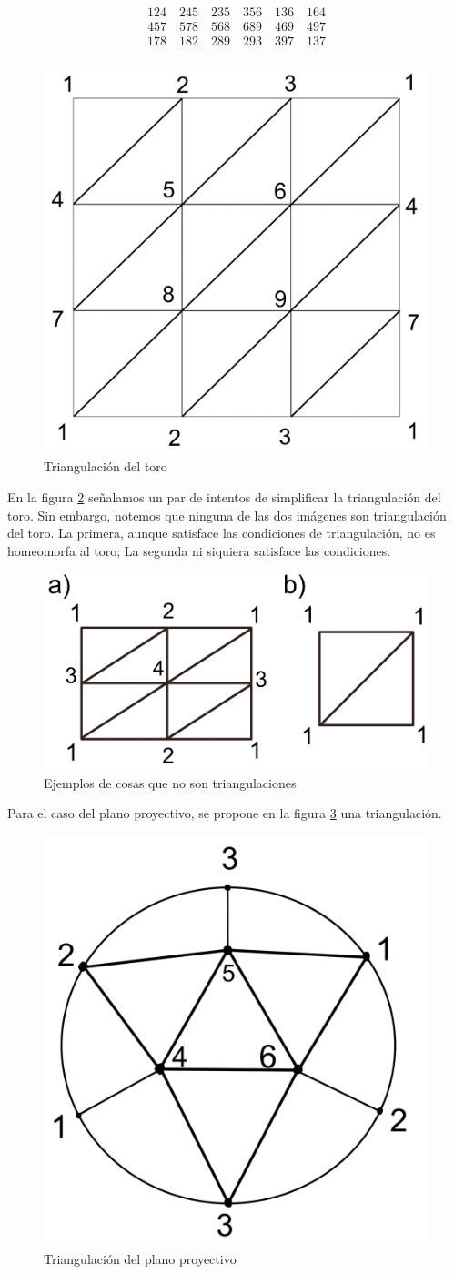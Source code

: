 \documentclass[a4paper,11pt,spanish, twoside, leqno]{tfg-uam}
\theoremstyle{definition}
\begin{document}
\begin{align*}
124 \quad 245 \quad 235 \quad 356 \quad 136 \quad 164 \\
457 \quad 578 \quad 568 \quad 689 \quad 469 \quad 497 \\
178 \quad 182 \quad 289 \quad 293 \quad 397 \quad 137 \\
\end{align*}

\begin{figure}[h!]
	\centering
	\includegraphics[width=0.3\linewidth]{imagenes/toro_triangulado.png}
	\caption{Triangulación del toro}
	\label{fig:toro triangulado}
\end{figure} 

En la figura \ref{fig:no triangulaciones} señalamos un par de intentos de simplificar la triangulación del toro. Sin embargo, notemos que ninguna de las dos imágenes son triangulación del toro. La primera, aunque satisface las condiciones de triangulación, no es homeomorfa al toro; La segunda ni siquiera satisface las condiciones.

\begin{figure}[h!]
	\centering
	\includegraphics[width=0.5\linewidth]{imagenes/no_triangulaciones.png}
	\caption{Ejemplos de cosas que no son triangulaciones}
	
	\label{fig:no triangulaciones}
\end{figure} 

Para el caso del plano proyectivo, se propone en la figura \ref{fig:plano proyectivo triangulado} una triangulación.

\begin{figure}[h!]
	\centering
	\includegraphics[width=0.3\linewidth]{imagenes/planop_triangulado.png}
	\caption{Triangulación del plano proyectivo}
	\label{fig:plano proyectivo triangulado}
\end{figure} 
\end{document}

